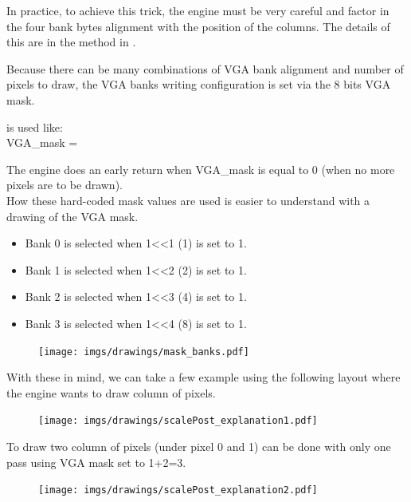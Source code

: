 In practice, to achieve this trick, the engine must be very careful and factor in the four bank bytes alignment with the position of the columns. The details of this are in the method  in .\\
\par 
\begin{minipage}{\textwidth}

\end{minipage}
Because there can be many combinations of VGA bank alignment and number of pixels to draw,
the VGA banks writing configuration is set via the 8 bits VGA mask.\\
\par
 \par
 \begin{minipage}{\textwidth}

\end{minipage}
 is used like:\\
 VGA\_mask = \\
 \par
 The engine does an early return when VGA\_mask is equal to 0 (when no more pixels are to be drawn).\\
How these hard-coded mask values are used is easier to understand with a drawing of the VGA mask. 
\begin{itemize}
\item Bank 0 is selected when 1<<1 (1) is set to 1.
\item Bank 1 is selected when 1<<2 (2) is set to 1.
\item Bank 2 is selected when 1<<3 (4) is set to 1.
\item Bank 3 is selected when 1<<4 (8) is set to 1.
\end{itemize}
\par


\begin{figure}[H]
\centering
 \texttt{[image: imgs/drawings/mask\_banks.pdf]}
 \end{figure}


With these in mind, we can take a few example using the following layout where the engine wants to draw column of pixels.
\begin{figure}[H]
\centering
 \texttt{[image: imgs/drawings/scalePost\_explanation1.pdf]}
 \end{figure}


 To draw two column of pixels (under pixel 0 and 1) can be done with only one pass using VGA mask set to 1+2=3.\\
 \begin{figure}[H]
 \centering
 \texttt{[image: imgs/drawings/scalePost\_explanation2.pdf]}
 \end{figure}





